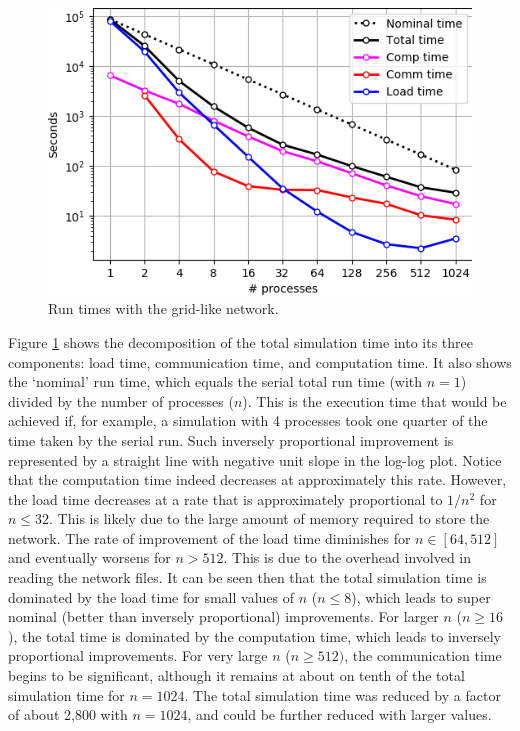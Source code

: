\begin{figure}[!ht]
    \centering
    \includegraphics[width=\columnwidth]{figs/syntheticplot.png}
    \caption{Run times with the grid-like network.}
    \label{fig:mpirun}
\end{figure}


Figure \ref{fig:mpirun} shows the decomposition of the total simulation time into its three components: load time, communication time, and computation time. It also shows the `nominal' run time, which equals the serial total run time (with $n=1$) divided by the number of processes ($n$). This is the execution time that would be achieved if, for example, a simulation with 4 processes took one quarter of the time taken by the serial run. Such inversely proportional improvement is represented by a  straight line with negative unit slope in the log-log plot. Notice that the computation time indeed decreases at approximately this rate. However, the load time decreases at a rate that is approximately proportional to $1/n^2$ for $n\leq 32$. This is likely due to the large amount of memory required to store the network. The rate of improvement of the load time diminishes for $n \in[64, 512]$ and eventually worsens for $n>512$. This is due to the overhead involved in reading the network files. It can be seen then that the total simulation time is dominated by the load time for small values of $n$ ($n\leq 8$), which leads to super nominal (better than inversely proportional) improvements. For larger $n$ ($n\geq 16$), the total time is dominated by the computation time, which leads to inversely proportional improvements. For very large $n$ ($n\geq 512)$, the communication time begins to be significant, although it remains at about on tenth of the total simulation time for $n=1024$. The total simulation time was reduced by a factor of about 2,800 with $n=1024$, and could be further reduced with larger values. 


